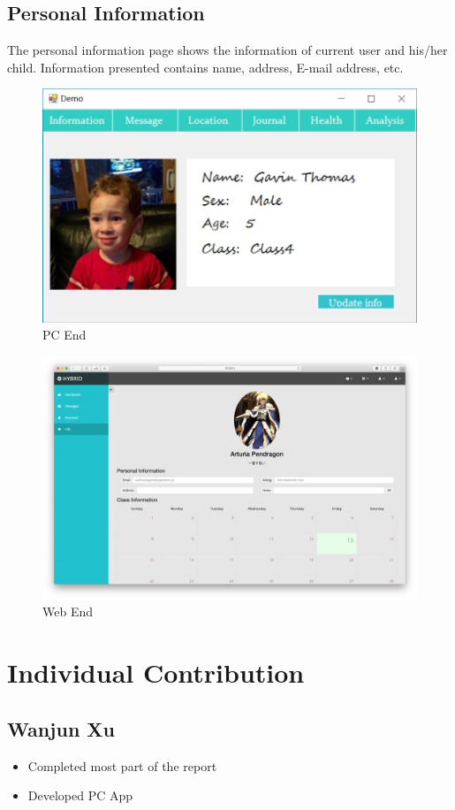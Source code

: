 \documentclass{article}
\begin{document}
\subsection{Personal Information}
The personal information page shows the information of current user and his/her child. Information presented contains name, address, E-mail address, etc.
	\begin{figure}[H]
 	 \centering
 		\includegraphics[width=0.8\linewidth]{img/information1.png}
 		\caption{PC End}
 	\end{figure}
 	\begin{figure}[H]
 	 \centering
 		\includegraphics[width=\linewidth]{img/information2.png}
 		\caption{Web End}
 	\end{figure}

\section{Individual Contribution}
\subsection{Wanjun Xu}
\begin{itemize}
	\item Completed most part of the report
	\item Developed PC App
\end{itemize}
\end{document}
